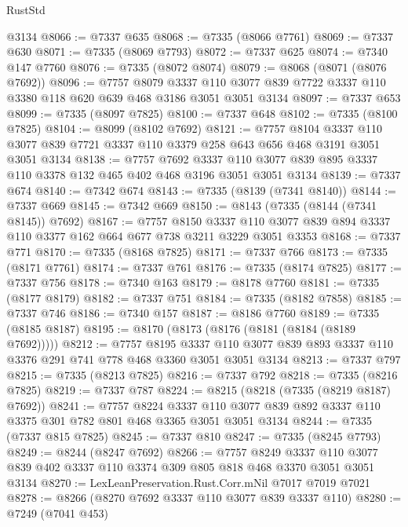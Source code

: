 \begin{lexlean}{RustStd}
\begin{coremodule}
    @3134
@8066 := @7337 @635
@8068 := @7335 (@8066 @7761)
@8069 := @7337 @630
@8071 := @7335 (@8069 @7793)
@8072 := @7337 @625
@8074 := @7340 @147 @7760
@8076 := @7335 (@8072 @8074)
@8079 := @8068 (@8071 (@8076 @7692))
@8096 := @7757
    @8079
    @3337
    @110
    @3077
    @839
    @7722
    @3337
    @110
    @3380
    @118
    @620
    @639
    @468
    @3186
    @3051
    @3051
    @3134
@8097 := @7337 @653
@8099 := @7335 (@8097 @7825)
@8100 := @7337 @648
@8102 := @7335 (@8100 @7825)
@8104 := @8099 (@8102 @7692)
@8121 := @7757
    @8104
    @3337
    @110
    @3077
    @839
    @7721
    @3337
    @110
    @3379
    @258
    @643
    @656
    @468
    @3191
    @3051
    @3051
    @3134
@8138 := @7757
    @7692
    @3337
    @110
    @3077
    @839
    @895
    @3337
    @110
    @3378
    @132
    @465
    @402
    @468
    @3196
    @3051
    @3051
    @3134
@8139 := @7337 @674
@8140 := @7342 @674
@8143 := @7335 (@8139 (@7341 @8140))
@8144 := @7337 @669
@8145 := @7342 @669
@8150 := @8143 (@7335 (@8144 (@7341 @8145)) @7692)
@8167 := @7757
    @8150
    @3337
    @110
    @3077
    @839
    @894
    @3337
    @110
    @3377
    @162
    @664
    @677
    @738
    @3211
    @3229
    @3051
    @3353
@8168 := @7337 @771
@8170 := @7335 (@8168 @7825)
@8171 := @7337 @766
@8173 := @7335 (@8171 @7761)
@8174 := @7337 @761
@8176 := @7335 (@8174 @7825)
@8177 := @7337 @756
@8178 := @7340 @163
@8179 := @8178 @7760
@8181 := @7335 (@8177 @8179)
@8182 := @7337 @751
@8184 := @7335 (@8182 @7858)
@8185 := @7337 @746
@8186 := @7340 @157
@8187 := @8186 @7760
@8189 := @7335 (@8185 @8187)
@8195 := @8170 (@8173 (@8176 (@8181 (@8184 (@8189 @7692)))))
@8212 := @7757
    @8195
    @3337
    @110
    @3077
    @839
    @893
    @3337
    @110
    @3376
    @291
    @741
    @778
    @468
    @3360
    @3051
    @3051
    @3134
@8213 := @7337 @797
@8215 := @7335 (@8213 @7825)
@8216 := @7337 @792
@8218 := @7335 (@8216 @7825)
@8219 := @7337 @787
@8224 := @8215 (@8218 (@7335 (@8219 @8187) @7692))
@8241 := @7757
    @8224
    @3337
    @110
    @3077
    @839
    @892
    @3337
    @110
    @3375
    @301
    @782
    @801
    @468
    @3365
    @3051
    @3051
    @3134
@8244 := @7335 (@7337 @815 @7825)
@8245 := @7337 @810
@8247 := @7335 (@8245 @7793)
@8249 := @8244 (@8247 @7692)
@8266 := @7757
    @8249
    @3337
    @110
    @3077
    @839
    @402
    @3337
    @110
    @3374
    @309
    @805
    @818
    @468
    @3370
    @3051
    @3051
    @3134
@8270 := LexLeanPreservation.Rust.Corr.mNil @7017 @7019 @7021
@8278 := @8266 (@8270 @7692 @3337 @110 @3077 @839 @3337 @110)
@8280 := @7249 (@7041 @453)

\end{coremodule}
\end{lexlean}

